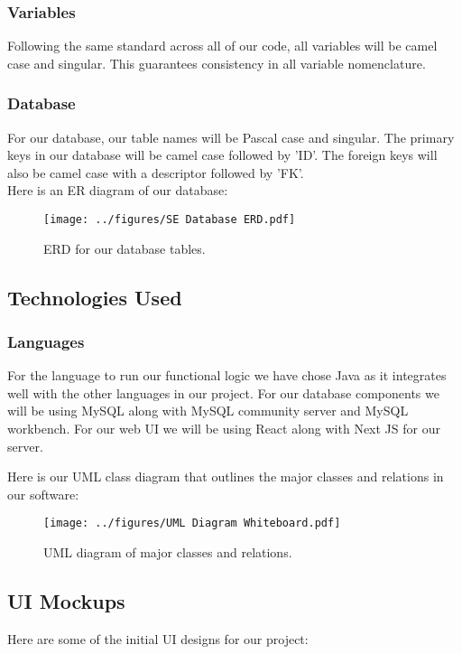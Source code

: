 \subsubsection{Variables}
Following the same standard across all of our code, all variables will be camel case and singular. This guarantees consistency in all variable nomenclature. 

\subsubsection{Database}
For our database, our table names will be Pascal case and singular. The primary keys in our database will be camel case followed by 'ID'. The foreign keys will also be camel case with a descriptor followed by 'FK'.\\

Here is an ER diagram of our database: 

\begin{figure}[hbt!]
    \centering
    \texttt{[image: ../figures/SE Database ERD.pdf]}
    \caption{ERD for our database tables.}
    \label{fig:ERD}
\end{figure} 

\pagebreak

\subsection{Technologies Used}

\subsubsection{Languages}
For the language to run our functional logic we have chose Java as it integrates well with the other languages in our project. For our database components we will be using MySQL along with MySQL community server and MySQL workbench. For our web UI we will be using React along with Next JS for our server.

Here is our UML class diagram that outlines the major classes and relations in our software:  

\begin{figure}[hbt!]
    \centering
    \texttt{[image: ../figures/UML Diagram Whiteboard.pdf]}
    \caption{UML diagram of major classes and relations.}
    \label{fig:UML}
\end{figure}

\pagebreak

\subsection{UI Mockups}
Here are some of the initial UI designs for our project:

